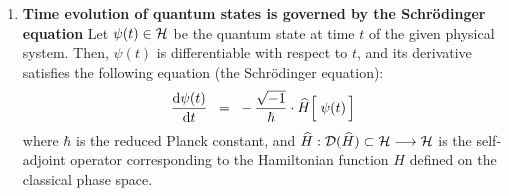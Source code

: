 \begin{enumerate}
\vskip 0.3cm
\item
	\textbf{Time evolution of quantum states is governed by the Schr\"{o}dinger equation}
	\vskip 0.05cm
	Let $\psi(t) \in \mathcal{H}$ be the quantum state at time $t$ of the given physical system.
	Then, $\psi(t)$ is differentiable with respect to $t$, and its derivative satisfies
	the following equation (the Schr\"{o}dinger equation):
	\begin{equation*}
	\dfrac{\d\psi(t)}{\d t}
	\;\; = \;\;
		-\,\dfrac{\sqrt{-1}}{\hbar}\cdot\widehat{H}\!\left[\;\overset{{\color{white}.}}{\psi(t)}\,\right]
	\end{equation*}
	where $\hbar$ is the reduced Planck constant, and
	$\widehat{H} : \mathcal{D}(\widehat{H}) \subset \mathcal{H} \longrightarrow \mathcal{H}$
	is the self-adjoint operator corresponding to the Hamiltonian function $H$
	defined on the classical phase space.

\end{enumerate}



